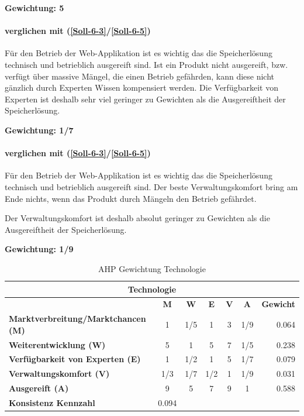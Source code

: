 \textbf{Gewichtung: 5}

\paragraph*{ verglichen mit  (\ref{Soll-6-3}/\ref{Soll-6-5})}
Für den Betrieb der Web-Applikation ist es wichtig das die Speicherlösung technisch und betrieblich ausgereift sind. Ist ein Produkt nicht ausgereift, bzw. verfügt über massive Mängel, die einen Betrieb gefährden, kann diese nicht gänzlich durch Experten Wissen kompensiert werden. Die Verfügbarkeit von Experten ist deshalb sehr viel geringer zu Gewichten als die Ausgereiftheit der Speicherlösung.

\textbf{Gewichtung: 1/7}

\paragraph*{ verglichen mit  (\ref{Soll-6-3}/\ref{Soll-6-5})}
Für den Betrieb der Web-Applikation ist es wichtig das die Speicherlösung technisch und betrieblich ausgereift sind. Der beste Verwaltungskomfort bring am Ende nichts, wenn das Produkt durch Mängeln den Betrieb gefährdet.

Der Verwaltungskomfort ist deshalb absolut geringer zu Gewichten als die Ausgereiftheit der Speicherlösung.

\textbf{Gewichtung: 1/9}

\begin{table}[htbp]
\caption{AHP Gewichtung Technologie}
\begin{tabular}{|l|c|c|c|c|c|r|}
\hline
\multicolumn{ 7}{|c|}{\textbf{Technologie}} \\ \hline
 & \textbf{M} & \textbf{W} & \textbf{E} & \textbf{V} & \textbf{A} & \multicolumn{1}{l|}{\textbf{Gewicht}} \\ \hline
\textbf{Marktverbreitung/Marktchancen (M)} & 1 & 1/5 & 1 & 3 & 1/9 & 0.064 \\ \hline
\textbf{Weiterentwicklung (W)} & 5 & 1 & 5 & 7 & 1/5 & 0.238 \\ \hline
\textbf{Verfügbarkeit von Experten (E)} & 1 & 1/2 & 1 & 5 & 1/7 & 0.079 \\ \hline
\textbf{Verwaltungskomfort (V)} & 1/3 & 1/7 & 1/2 & 1 & 1/9 & 0.031 \\ \hline
\textbf{Ausgereift (A)} & 9 & 5 & 7 & 9 & 1 & 0.588 \\ \hline
\textbf{Konsistenz Kennzahl} & \multicolumn{1}{r|}{0.094} \\ \cline{1-2}
\end{tabular}
\label{AHPTechnologie}
\end{table}


